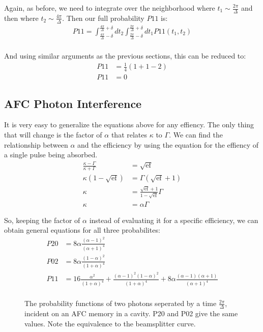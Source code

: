 \documentclass[12pt]{article}
\begin{document}
Again, as before, we need to integrate over the neighborhood where $t_1 \sim \frac{2 \pi}{\Delta}$ and then where $t_2 \sim \frac{4 \pi}{\Delta}$. Then our full probability $P11$ is:
\begin{align}
P11 = \int^{\frac{4 \pi}{\Delta}+\delta}_{\frac{4 \pi}{\Delta}-\delta}dt_2 \int^{\frac{2 \pi}{\Delta}+\delta}_{\frac{2 \pi}{\Delta}-\delta}dt_1 P11(t_1, t_2)\\
\end{align}

And using similar arguments as the previous sections, this can be reduced to:
\begin{align}
P11 &= \frac{1}{4}\left ( 1 + 1 -2\right) \\
P11 &= 0
\end{align}
\subsection{AFC Photon Interference}
It is very easy to generalize the equations above for any effiency. The only thing that will change
is the factor of $\alpha$ that relates $\kappa$ to $\Gamma$. We can find the relationship between
$\alpha$ and the efficiency by using the equation for the effiency of a single pulse being absorbed.
\begin{align}
\frac{\kappa - \Gamma}{\kappa+\Gamma}& = \sqrt{\textrm{ef}} \\
\kappa \left(1-\sqrt{\textrm{ef}}\right) &= \Gamma \left(\sqrt{\textrm{ef}}+1\right)\\
\kappa &= \frac{\sqrt{\textrm{ef}} + 1}{1-\sqrt{\textrm{ef}}}\Gamma\\
\kappa &= \alpha \Gamma
\end{align}

So, keeping the factor of $\alpha$ instead of evaluating it for a specific efficiency, we can
obtain general equations for all three probabilites:
\begin{align}
P20 & =8\alpha \frac{(\alpha -1)^2}{(\alpha+1)^4} \\
P02 &= 8\alpha \frac{(1-\alpha)^2}{(1+\alpha)^4}\\
P11 & = 16\frac{\alpha^2}{(1+\alpha)^4} +\frac{(\alpha-1)^2(1-\alpha)^2}{(1+\alpha)^4}+8\alpha \frac{(\alpha-1)(\alpha+1)}{(\alpha+1)^4}\\
\end{align}
\label{general}

\begin{figure}[H]
\caption{The probability functions of two photons seperated by a time $\frac{2 \pi}{\Delta}$, incident on an AFC memory in a cavity. P20 and P02 give the same values. Note the
equivalence to the beamsplitter curve.}

\end{figure}
\end{document}
